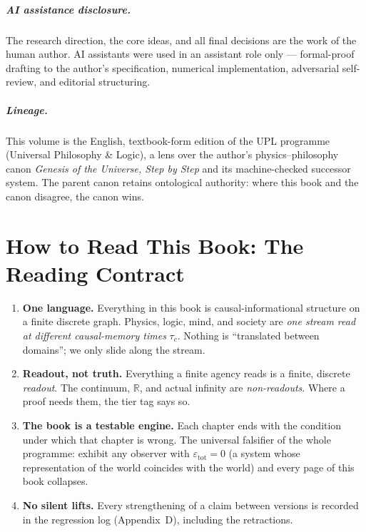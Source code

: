 \documentclass[11pt,a4paper,twoside]{book}
\theoremstyle{plain}
\theoremstyle{definition}
\theoremstyle{remark}
\begin{document}
\paragraph{AI assistance disclosure.} The research direction, the core ideas,
and all final decisions are the work of the human author. AI assistants were
used in an assistant role only --- formal-proof drafting to the author's
specification, numerical implementation, adversarial self-review, and
editorial structuring.

\paragraph{Lineage.} This volume is the English, textbook-form edition of the
UPL programme (Universal Philosophy \& Logic), a lens over the author's
physics--philosophy canon \emph{Genesis of the Universe, Step by Step} and its
machine-checked successor system. The parent canon retains ontological
authority: where this book and the canon disagree, the canon wins.

\chapter*{How to Read This Book: The Reading Contract}

\begin{enumerate}
\item \textbf{One language.} Everything in this book is causal-informational
  structure on a finite discrete graph. Physics, logic, mind, and society are
  \emph{one stream read at different causal-memory times} $\tau_c$. Nothing is
  ``translated between domains''; we only slide along the stream.
\item \textbf{Readout, not truth.} Everything a finite agency reads is a
  finite, discrete \emph{readout}. The continuum, $\mathbb{R}$, and actual
  infinity are \emph{non-readouts}. Where a proof needs them, the tier tag
  says so.
\item \textbf{The book is a testable engine.} Each chapter ends with the
  condition under which that chapter is wrong. The universal falsifier of the
  whole programme: exhibit any observer with $\varepsilon_{\mathrm{tot}}=0$
  (a system whose representation of the world coincides with the world) and
  every page of this book collapses.
\item \textbf{No silent lifts.} Every strengthening of a claim between
  versions is recorded in the regression log (Appendix~D), including the
  retractions.
\end{enumerate}
\end{document}
